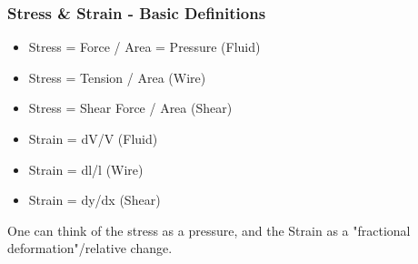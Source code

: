 \documentclass[../PHYS306Notes.tex]{subfiles}
\begin{document}
\subsubsection{Stress \& Strain - Basic Definitions}
\begin{itemize}
    \item Stress = Force / Area = Pressure (Fluid)
    \item Stress = Tension / Area (Wire)
    \item Stress = Shear Force / Area (Shear)
    \item Strain = dV/V (Fluid)
    \item Strain = dl/l (Wire)
    \item Strain = dy/dx (Shear)
\end{itemize}
One can think of the stress as a pressure, and the Strain as a "fractional deformation"/relative change.
\end{document}
